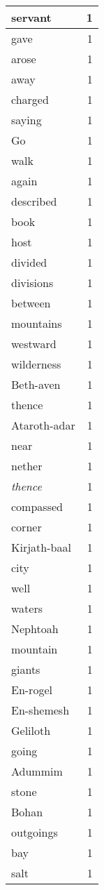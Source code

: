 \begin{center}
\begin{longtable}{l|r}
servant & 1\\ \hline 
gave & 1\\ \hline 
arose & 1\\ \hline 
away & 1\\ \hline 
charged & 1\\ \hline 
saying & 1\\ \hline 
Go & 1\\ \hline 
walk & 1\\ \hline 
again & 1\\ \hline 
described & 1\\ \hline 
book & 1\\ \hline 
host & 1\\ \hline 
divided & 1\\ \hline 
divisions & 1\\ \hline 
between & 1\\ \hline 
mountains & 1\\ \hline 
westward & 1\\ \hline 
wilderness & 1\\ \hline 
Beth-aven & 1\\ \hline 
thence & 1\\ \hline 
Ataroth-adar & 1\\ \hline 
near & 1\\ \hline 
nether & 1\\ \hline 
\emph{thence} & 1\\ \hline 
compassed & 1\\ \hline 
corner & 1\\ \hline 
Kirjath-baal & 1\\ \hline 
city & 1\\ \hline 
well & 1\\ \hline 
waters & 1\\ \hline 
Nephtoah & 1\\ \hline 
mountain & 1\\ \hline 
giants & 1\\ \hline 
En-rogel & 1\\ \hline 
En-shemesh & 1\\ \hline 
Geliloth & 1\\ \hline 
going & 1\\ \hline 
Adummim & 1\\ \hline 
stone & 1\\ \hline 
Bohan & 1\\ \hline 
outgoings & 1\\ \hline 
bay & 1\\ \hline 
salt & 1\\ \hline 

\end{longtable}
\end{center}
